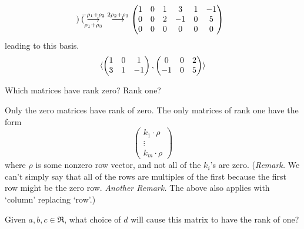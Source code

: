 \begin{exercises}
\begin{answer}
\begin{exparts}
\begin{equation*}
\begin{pmatrix}
            \end{pmatrix}
            \grstep[\rho_1+\rho_3]{-\rho_1+\rho_2}
            \;\grstep{2\rho_2+\rho_3}
            \begin{pmatrix}
              1  &0  &1  &3  &1  &-1  \\
              0  &0  &2  &-1 &0  &5   \\
              0  &0  &0  &0  &0  &0
            \end{pmatrix}
          \end{equation*}
          leading to this basis.
          \begin{equation*}
            \sequence{
            \begin{pmatrix}
              1  &0  &1  \\
              3  &1  &-1
            \end{pmatrix},
            \begin{pmatrix}
              0  &0  &2  \\
             -1  &0  &5
            \end{pmatrix}  }
          \end{equation*}
      \end{exparts}   
     \end{answer}
  \item 
    Which matrices have rank zero?
    Rank one?
    \begin{answer}
      Only the zero matrices have rank of zero.
      The only matrices of rank one have the form
      \begin{equation*}
        \begin{pmatrix}
           k_1\cdot \rho  \\
            \vdots  \\
           k_m\cdot \rho
        \end{pmatrix}
      \end{equation*}
      where \( \rho \) is some nonzero row vector, and not all of the 
      \( k_i \)'s are zero.
      (\textit{Remark.}
      We can't simply say that all of the rows are multiples of the first
      because the first row might be the zero row.
      \textit{Another Remark.}
      The above also applies with `column' replacing `row'.)  
    \end{answer}
  \recommended \item
    Given \( a,b,c\in\Re \), what choice of \( d \) will cause this matrix 
    to have the rank of one?
    \begin{equation*}

\end{equation*}
\end{exercises}
